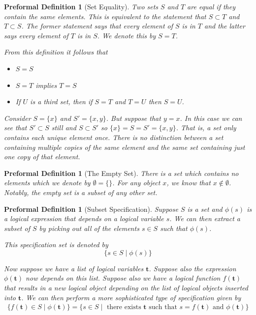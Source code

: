 \documentclass[oneside, 12pt]{book}
\theoremstyle{break}
\newtheorem{preformal definition}[definition]{Preformal Definition}
\newtheorem{preformal theorem}[theorem]{Preformal Theorem}
\newcommand{\bv}[1]{\boldsymbol{#1}}
\begin{document}
			\begin{preformal definition}[Set Equality]
				Two sets $S$ and $T$ are equal if they contain the same elements.
				This is equivalent to the statement that $S\subset T$ and $T\subset S$.
				The former statement says that every element of $S$ is in $T$ and the latter says every element of $T$ is in $S$.
				We denote this by $S=T$.
				
				From this definition it follows that
				\begin{itemize}
					\item{$S=S$}
					\item{$S=T$ implies $T=S$}
					\item{If $U$ is a third set, then if $S=T$ and $T=U$ then $S=U$.}
				\end{itemize}
				
				Consider $S = \{x\}$ and $S' = \{x, y\}$.
				But suppose that $y = x$.
				In this case we can see that $S' \subset S$ still and $S \subset S'$ so $\{x\} = S = S' = \{x, y\}$.
				That is, a set only contains each unique element once. 
				There is no distinction between a set containing multiple copies of the same element and the same set containing just one copy of that element.
			\end{preformal definition}
			
			\begin{preformal definition}[The Empty Set]
				There is a set which contains no elements which we denote by $\emptyset = \{\}$.
				For any object $x$, we know that $x\not \in \emptyset$.
				Notably, the empty set is a subset of any other set.
			\end{preformal definition}
			
			\begin{preformal definition}[Subset Specification]
				Suppose $S$ is a set and $\phi(s)$ is a logical expression that depends on a logical variable $s$. 		
				We can then extract a subset of $S$ by picking out all of the elements $s\in S$ such that $\phi(s)$.
				
				This specification set is denoted by
				\begin{equation*}
					\{s\in S \mid \phi(s)\}
				\end{equation*}
				
				Now suppose we have a list of logical variables $\bv{t}$.
				Suppose also the expression $\phi(\bv{t})$ now depends on this list.
				Suppose also we have a logical function $f(\bv{t})$ that results in a new logical object depending on the list of logical objects inserted into $\bv{t}$. 
				We can then perform a more sophisticated type of specification given by
				\begin{align*}
					\{f(\bv{t})\in S \mid \phi(\bv{t})\} = \{s\in S \mid \text{ there exists } \bv{t} \text{ such that } s = f(\bv{t}) \text{ and } \phi(\bv{t})\}
				\end{align*}
			\end{preformal definition}
			
\end{document}
